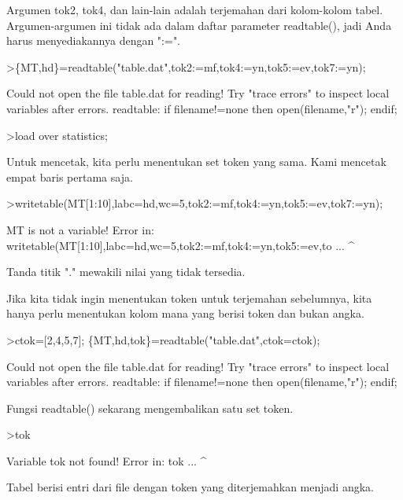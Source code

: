 \documentclass[a4paper,10pt]{article}
\begin{document}
\begin{eulernotebook}
\begin{eulercomment}
Argumen tok2, tok4, dan lain-lain adalah terjemahan dari kolom-kolom
tabel. Argumen-argumen ini tidak ada dalam daftar parameter
readtable(), jadi Anda harus menyediakannya dengan ":=".
\end{eulercomment}
\begin{eulerprompt}
>\{MT,hd\}=readtable("table.dat",tok2:=mf,tok4:=yn,tok5:=ev,tok7:=yn);
\end{eulerprompt}
\begin{euleroutput}
  Could not open the file
  table.dat
  for reading!
  Try "trace errors" to inspect local variables after errors.
  readtable:
      if filename!=none then open(filename,"r"); endif;
\end{euleroutput}
\begin{eulerprompt}
>load over statistics;
\end{eulerprompt}
\begin{eulercomment}
Untuk mencetak, kita perlu menentukan set token yang sama. Kami
mencetak empat baris pertama saja.
\end{eulercomment}
\begin{eulerprompt}
>writetable(MT[1:10],labc=hd,wc=5,tok2:=mf,tok4:=yn,tok5:=ev,tok7:=yn);
\end{eulerprompt}
\begin{euleroutput}
  MT is not a variable!
  Error in:
  writetable(MT[1:10],labc=hd,wc=5,tok2:=mf,tok4:=yn,tok5:=ev,to ...
                     ^
\end{euleroutput}
\begin{eulercomment}
Tanda titik "." mewakili nilai yang tidak tersedia.

Jika kita tidak ingin menentukan token untuk terjemahan sebelumnya,
kita hanya perlu menentukan kolom mana yang berisi token dan bukan
angka.
\end{eulercomment}
\begin{eulerprompt}
>ctok=[2,4,5,7]; \{MT,hd,tok\}=readtable("table.dat",ctok=ctok);
\end{eulerprompt}
\begin{euleroutput}
  Could not open the file
  table.dat
  for reading!
  Try "trace errors" to inspect local variables after errors.
  readtable:
      if filename!=none then open(filename,"r"); endif;
\end{euleroutput}
\begin{eulercomment}
Fungsi readtable() sekarang mengembalikan satu set token.
\end{eulercomment}
\begin{eulerprompt}
>tok
\end{eulerprompt}
\begin{euleroutput}
  Variable tok not found!
  Error in:
  tok ...
     ^
\end{euleroutput}
\begin{eulercomment}
Tabel berisi entri dari file dengan token yang diterjemahkan menjadi
angka.


\end{eulercomment}
\end{eulernotebook}
\end{document}
